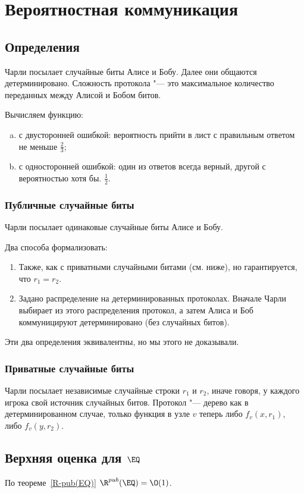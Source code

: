 \chapter{Вероятностная коммуникация}
\section{Определения}
Чарли посылает случайные биты Алисе и Бобу. Далее они общаются детерминировано. Сложность протокола "--- это максимальное количество переданных между Алисой и Бобом битов.

Вычисляем функцию:
\begin{enumerate}[a)]
\item с двусторонней ошибкой: вероятность прийти в лист с правильным ответом не меньше $\frac{2}{3}$;
\item с односторонней ошибкой: один из ответов всегда верный, другой с вероятностью хотя бы. $\frac{1}{2}$.
\end{enumerate}

\subsection{Публичные случайные биты}
Чарли посылает одинаковые случайные биты Алисе и Бобу.

Два способа формализовать:
\begin{enumerate}
\item Также, как с приватными случайными битами (см. ниже), но гарантируется, что $r_1 = r_2$.
\item Задано распределение на детерминированных протоколах. Вначале Чарли выбирает из этого распределения протокол, а затем Алиса и Боб коммуницируют детерминировано (без случайных битов).
\end{enumerate}

Эти два определения эквивалентны, но мы этого не доказывали.

\subsection{Приватные случайные биты}
Чарли посылает независимые случайные строки $r_1$ и $r_2$, иначе говоря, у каждого игрока свой источник случайных битов. Протокол "--- дерево как в детерминированном случае, только функция в узле $v$ теперь либо $f_v(x, r_1)$, либо $f_v(y, r_2)$.

\section{Верхняя оценка для \texorpdfstring{$\EQ$}{EQ}}
По теореме~\ref{R-pub(EQ)} $\R^{pub}(\EQ) = \O(1)$.

